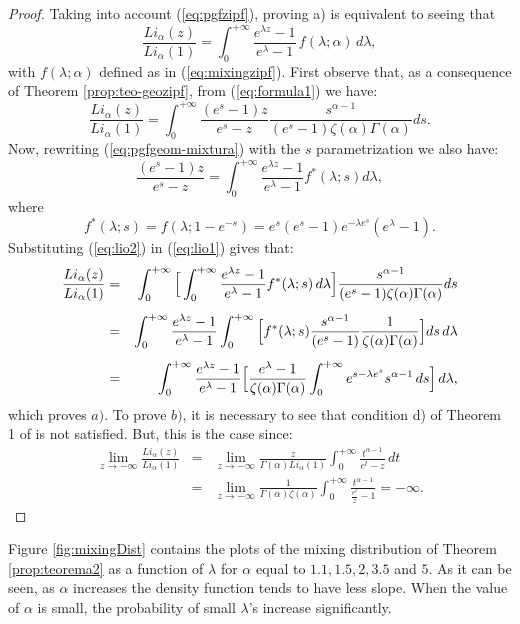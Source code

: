 \documentclass{article}
\begin{document}
\begin{proof}
Taking into account (\ref{eq:pgfzipf}), proving a) is equivalent to seeing that
$$
\frac{Li_{\alpha} (z)}{Li_{\alpha} (1)} = \int_0^{+\infty} \frac{e^{\lambda z}-1}{e^{\lambda}-1} \, f(\lambda; \alpha)\, d \lambda,
$$ 
with $f(\lambda; \alpha)$ defined as in (\ref{eq:mixingzipf}). First observe that, as a consequence of Theorem \ref{prop:teo-geozipf}, from (\ref{eq:formula1}) we have:
\begin{equation} \label{eq:lio1}
\frac{Li_{\alpha} (z)}{Li_{\alpha} (1)} = \int_0^{+\infty}     \frac{(e^{s}-1) z}{e^{s}-z}    \frac{s^{\alpha-1}}{(e^{s}-1) \zeta(\alpha)\Gamma(\alpha)} ds.
\end{equation}
Now, rewriting (\ref{eq:pgfgeom-mixtura}) with the $s$ parametrization we also have:
\begin{equation} \label{eq:lio2}
\frac{ (e^{s}-1) z}{e^{s}-z}= \int_0^{+\infty} \frac{ e^{\lambda z}-1}{e^{\lambda}-1} f^*(\lambda;s) d \lambda,
\end{equation}
where $$f^*(\lambda;s)=f(\lambda;1-e^{-s})=e^{s} (e^{s}-1) e^{-\lambda e^{s}} (e^{\lambda}-1).$$
Substituting (\ref{eq:lio2}) in (\ref{eq:lio1}) gives that:
\begin{eqnarray} 
	\frac{Li_{\alpha} (z)}{Li_{\alpha} (1)} & = & \int_0^{+\infty}  \Big[  \int_0^{+\infty} \frac{ e^{\lambda z}-1}{e^{\lambda}-1} f^*(\lambda;s)\, d \lambda \Big]  \frac{s^{\alpha-1}}{(e^{s}-1) \zeta(\alpha) \Gamma(\alpha)} d s \nonumber \\[5 pt] \nonumber & = &  
	\int_0^{+\infty}   \frac{ e^{\lambda z}-1}{e^{\lambda}-1} \int_0^{+\infty}  \Big[  f^*(\lambda; s) \frac{s^{\alpha-1}}{(e^{s}-1)} \frac{1}{\zeta(\alpha) \Gamma(\alpha)}     \Big]  ds\, d\lambda \noindent \\[5 pt] \nonumber & = &   	\int_0^{+\infty}   \frac{e^{\lambda z}-1}{e^{\lambda}-1}  \Big[ \frac{e^{\lambda}-1}{\zeta(\alpha) \Gamma(\alpha)}    \int_0^{+\infty} e^{s-\lambda e^{s}} s^{\alpha-1}\, ds \Big]\,d\lambda,
\end{eqnarray}
which proves $a)$. To prove $b)$, it is necessary to see that condition d) of Theorem 1 of \cite{valero2010zero} is not satisfied. But, this is the case since:
\begin{eqnarray}
\lim_{z \to -\infty} \frac{Li_{\alpha} (z)}{Li_{\alpha} (1)} & = &\lim_{z \to -\infty} \frac{z}{\Gamma(\alpha) Li_{\alpha} (1)} \int_0^{+\infty} \frac{t^{\alpha-1}}{e^{t}-z} \, dt \nonumber \\   & = &  \lim_{z \to -\infty} \frac{1}{\Gamma(\alpha) \zeta(\alpha)} \int_0^{+\infty} \frac{ t^{\alpha-1}  }{ \frac{e^{t}}{z}-1}  =-\infty.
\end{eqnarray}
\end{proof}
Figure \ref{fig:mixingDist} contains the plots of the mixing distribution of Theorem \ref{prop:teorema2} as a function of $\lambda$ for $\alpha$ equal to $1.1, 1.5, 2, 3.5$ and $5$. As it can be seen, as $\alpha$ increases the density function tends to have less slope. When the value of $\alpha$ is small, the probability of small $\lambda$'s increase significantly.
\end{document}
